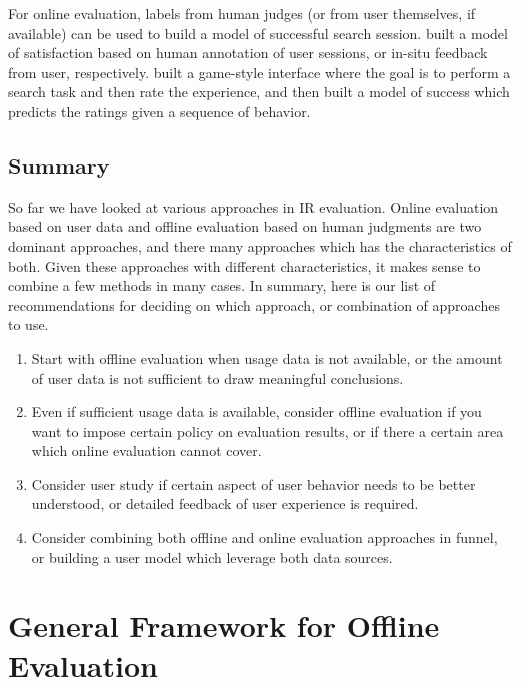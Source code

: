 For online evaluation, labels from human judges (or from user themselves, if available) can be used to build a model of successful search session. \citep{Hassan:2010,Hassan:2012} built a model of satisfaction based on human annotation of user sessions, or in-situ feedback from user, respectively. \cite{Ageev:2011} built a game-style interface where the goal is to perform a search task and then rate the experience, and then built a model of success which predicts the ratings given a sequence of behavior.


\subsection{Summary}
So far we have looked at various approaches in IR evaluation. Online evaluation based on user data and offline evaluation based on human judgments are two dominant approaches, and there many approaches which has the characteristics of both. Given these approaches with different characteristics, it makes sense to combine a few methods in many cases. In summary, here is our list of recommendations for deciding on which approach, or combination of approaches to use.

\begin{enumerate}
	\item Start with offline evaluation when usage data is not available, or the amount of user data is not sufficient to draw meaningful conclusions.
	\item Even if sufficient usage data is available, consider offline evaluation if you want to impose certain policy on evaluation results, or if there a certain area which online evaluation cannot cover.
	\item Consider user study if certain aspect of user behavior needs to be better understood, or detailed feedback of user experience is required.
	\item Consider combining both offline and online evaluation approaches in funnel, or building a user model which leverage both data sources.
\end{enumerate}

\section{General Framework for Offline Evaluation}

